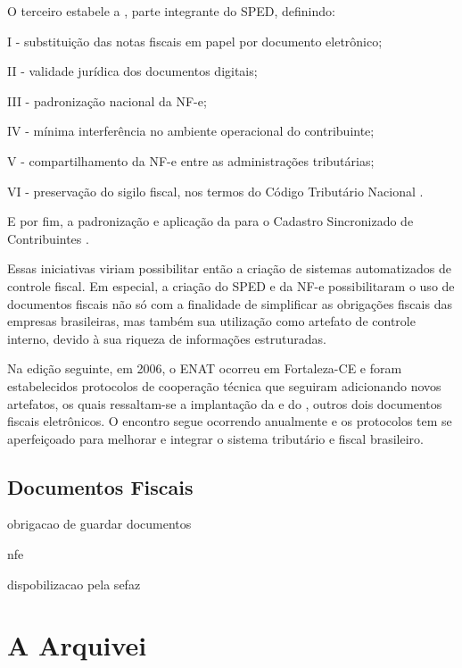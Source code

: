 O terceiro estabele a , parte integrante do SPED, definindo:

\begin{citacao}
I - substituição das notas fiscais em papel por documento eletrônico;

II - validade jurídica dos documentos digitais;

III - padronização nacional da NF-e;

IV - mínima interferência no ambiente operacional do contribuinte;

V - compartilhamento da NF-e entre as administrações tributárias;

VI - preservação do sigilo fiscal, nos termos do Código Tributário Nacional \cite{enat:2005:protocolo3}. 
\end{citacao}

E por fim, a padronização e aplicação da  para o Cadastro Sincronizado de Contribuintes \cite{enat:2005:protocolo4}.

Essas iniciativas viriam possibilitar então a criação de sistemas automatizados de controle fiscal. Em especial, a criação do SPED e da NF-e possibilitaram o uso de documentos fiscais não só com a finalidade de simplificar as obrigações fiscais das empresas brasileiras, mas também sua utilização como artefato de controle interno, devido à sua riqueza de informações estruturadas.

Na edição seguinte, em 2006, o ENAT ocorreu em Fortaleza-CE e foram estabelecidos protocolos de cooperação técnica que seguiram adicionando novos artefatos, os quais ressaltam-se a implantação da  e do , outros dois documentos fiscais eletrônicos. O encontro segue ocorrendo anualmente e os protocolos tem se aperfeiçoado para melhorar e integrar o sistema tributário e fiscal brasileiro.


\subsection{Documentos Fiscais}



obrigacao de guardar documentos

nfe

dispobilizacao pela sefaz

\section{A Arquivei}
\label{section:arquivei}


